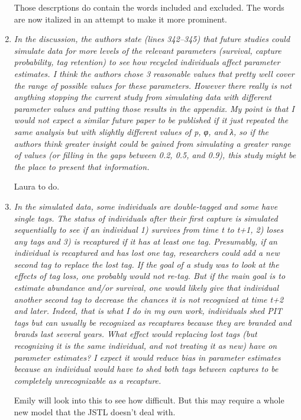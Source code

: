 \documentclass[12pt]{article}
\begin{document}
\begin{enumerate}
Those descrptions do contain the words included and excluded. The words are now italized in an attempt to make it more prominent. 

\item {\it In the discussion, the authors state (lines 342–345) that future studies could simulate data for more levels of the relevant parameters (survival, capture probability, tag retention) to see how recycled individuals affect parameter estimates. I think the authors chose 3 reasonable values that pretty well cover the range of possible values for these parameters. However there really is not anything stopping the current study from simulating data with different parameter values and putting those results in the appendix. My point is that I would not expect a similar future paper to be published if it just repeated the same analysis but with slightly different values of p, φ, and λ, so if the authors think greater insight could be gained from simulating a greater range of values (or filling in the gaps between 0.2, 0.5, and 0.9), this study might be the place to present that information. }

Laura to do.

\item {\it In the simulated data, some individuals are double-tagged and some have single tags. The status of individuals after their first capture is simulated sequentially to see if an individual 1) survives from time t to t+1, 2) loses any tags and 3) is recaptured if it has at least one tag. Presumably, if an individual is recaptured and has lost one tag, researchers could add a new second tag to replace the lost tag. If the goal of a study was to look at the effects of tag loss, one probably would not re-tag. But if the main goal is to estimate abundance and/or survival, one would likely give that individual another second tag to decrease the chances it is not recognized at time t+2 and later. Indeed, that is what I do in my own work, individuals shed PIT tags but can usually be recognized as recaptures because they are branded and brands last several years. What effect would replacing lost tags (but recognizing it is the same individual, and not treating it as new) have on parameter estimates? I expect it would reduce bias in parameter estimates because an individual would have to shed both tags between captures to be completely unrecognizable as a recapture.}

Emily will look into this to see how difficult.  But this may require a whole new model that the JSTL doesn't deal with.


\end{enumerate}
\end{document}
